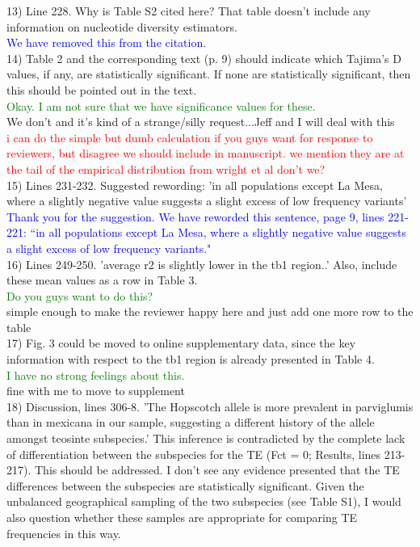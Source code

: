 \documentclass[11pt]{article}
\newcommand{\res}[1]{\noindent \textcolor{blue}{{#1}} \\}
\newcommand{\jri}[1]{\noindent \textcolor{red}{{#1}} \\}
\newcommand{\lev}[1]{\noindent \textcolor{green}{{#1}} \\}
\newcommand{\mbh}[1]{\noindent \textcolor{Dandelion}{{#1}}\\}
\begin{document}
13) Line 228. Why is Table S2 cited here? That table doesn't include any information on nucleotide diversity estimators.\\

\res{We have removed this from the citation.}

14) Table 2 and the corresponding text (p. 9) should indicate which Tajima's D values, if any, are statistically significant. If none are statistically significant, then this should be pointed out in the text. \\

\lev{Okay. I am not sure that we have significance values for these.}

\mbh{We don't and it's kind of a strange/silly request...Jeff and I will deal with this}
\jri{ i can do the simple but dumb calculation if you guys want for response to reviewers, but disagree we should include in manuscript. we mention they are at the tail of the empirical distribution from wright et al don't we?}

15) Lines 231-232. Suggested rewording: 'in all populations except La Mesa, where a slightly negative value suggests a slight excess of low frequency variants'\\

\res{Thank you for the suggestion. We have reworded this sentence, page 9, lines 221-221: ``in all populations except La Mesa, where a slightly negative value suggests a slight excess of low frequency variants."}

16) Lines 249-250. 'average r2 is slightly lower in the tb1 region..' Also, include these mean values as a row in Table 3. \\

\lev{Do you guys want to do this?}

\mbh{simple enough to make the reviewer happy here and just add one more row to the table}

17) Fig. 3 could be moved to online supplementary data, since the key information with respect to the tb1 region is already presented in Table 4. \\

\lev{I have no strong feelings about this.}
\mbh{fine with me to move to supplement}

18) Discussion, lines 306-8. 'The Hopscotch allele is more prevalent in parviglumis than in mexicana in our sample, suggesting a different history of the allele amongst teosinte subspecies.' This inference is contradicted by the complete lack of differentiation between the subspecies for the TE (Fct = 0; Results, lines 213-217). This should be addressed. I don't see any evidence presented that the TE differences between the subspecies are statistically significant. Given the unbalanced geographical sampling of the two subspecies (see Table S1), I would also question whether these samples are appropriate for comparing TE frequencies in this way. \\
\end{document}
